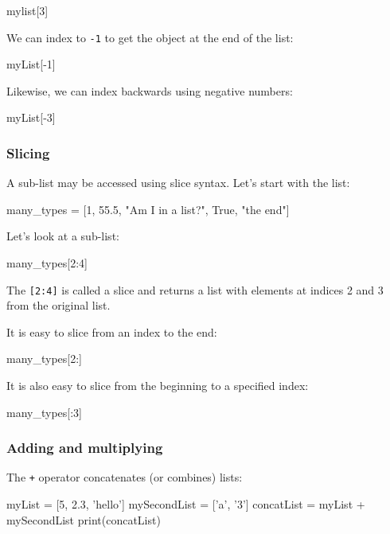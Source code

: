 \documentclass[12pt]{article} \newif\ifsolution\solutiontrue %
\begin{document}
\begin{python}
mylist[3]
\end{python}

We can index to \texttt{-1} to get the object at the end of the list:

\begin{python}
myList[-1]
\end{python}

Likewise, we can index backwards using negative numbers:

\begin{python}
myList[-3]
\end{python}

\subsubsection{Slicing}\label{slicing}

A sub-list may be accessed using slice syntax. Let's start with the
list:

\begin{python}
many_types = [1, 55.5, "Am I in a list?", True, "the end"]
\end{python}

Let's look at a sub-list:

\begin{python}
many_types[2:4]
\end{python}

The \texttt{{[}2:4{]}} is called a slice and returns a list with
elements at indices 2 and 3 from the original list.

It is easy to slice from an index to the end:

\begin{python}
many_types[2:]
\end{python}

It is also easy to slice from the beginning to a specified index:

\begin{python}
many_types[:3]
\end{python}

\subsubsection{Adding and multiplying}\label{adding-and-multiplying}

The \texttt{+} operator concatenates (or combines) lists:

\begin{python}
myList = [5, 2.3, 'hello'] mySecondList = ['a', '3'] concatList = myList + mySecondList print(concatList)
\end{python}
\end{document}
